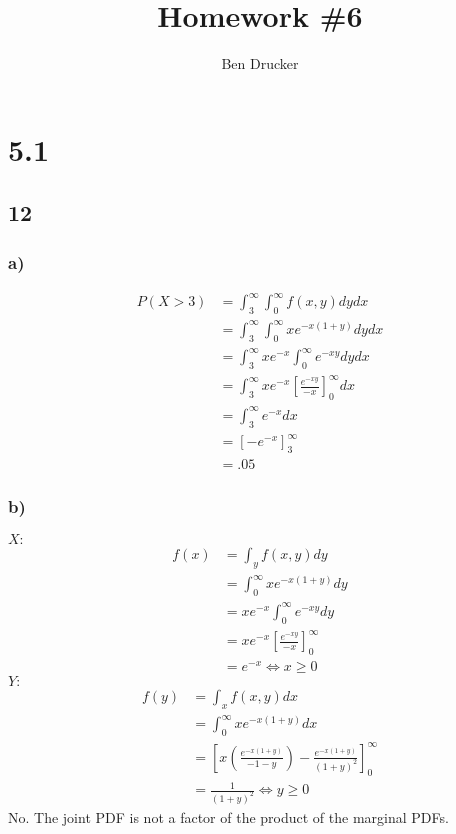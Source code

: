 \documentclass{article}
\newcommand{\hwkNum}{6}
\newcommand{\hwkAuthors}{Ben Drucker}
\begin{document}
\title{Homework \#\hwkNum}
\author{\hwkAuthors}
\date{}

\maketitle


\section*{5.1}
	\subsection*{12}
		\subsubsection*{a)}
			\begin{align*}
				P(X>3) &= \int_3^\infty \int_0^\infty f(x,y)dy dx \\
				&= \int_3^\infty \int_0^\infty xe^{-x(1+y)}dydx \\
				&= \int_3^\infty xe^{-x}\int_0^\infty e^{-xy}dydx \\
				&= \int_3^\infty xe^{-x} \left [\frac{e^{-xy}}{-x} \right ]^\infty_0 dx \\
				&= \int_3^\infty e^{-x} dx \\
				&= \left[ -e^{-x} \right ]_3^\infty \\
				&= .05
			\end{align*}
		\subsubsection*{b)}
			$X:$
				\begin{align*}
					f(x) &= \int_y f(x,y) dy \\
					&= \int_0^\infty xe^{-x(1+y)} dy \\
					&= xe^{-x} \int_0^\infty e^{-xy} dy \\
					&= xe^{-x} \left [ \frac{e^{-xy}}{-x} \right ]^\infty_0 \\
					&= e^{-x} \Leftrightarrow x\geq 0
				\end{align*}
			$Y:$
				\begin{align*}
					f(y) &= \int_x f(x,y) dx \\
					&= \int_0^\infty xe^{-x(1+y)} dx \\
					&= \left [ x \left ( \frac{e^{-x(1+y)}}{{-1-y}} \right ) - \frac{e^{-x(1+y)}}{(1+y)^2} \right ]_0^\infty \\
					&=\frac{1}{(1+y)^2} \Leftrightarrow y\geq 0
				\end{align*}
			No. The joint PDF is not a factor of the product of the marginal PDFs. 		
\end{document}
